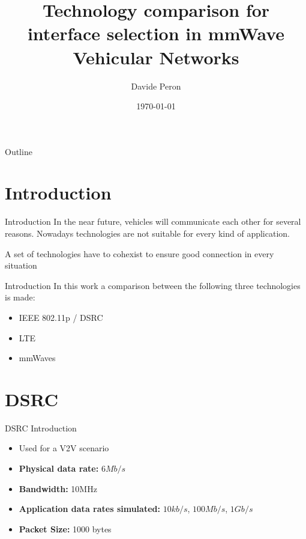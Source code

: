 \documentclass{beamer}
\title{Technology comparison for interface selection in mmWave Vehicular Networks}
\author{Davide Peron}
\date{\today}
\begin{document}
	\maketitle

	\begin{frame}{Outline}
		\tableofcontents
	\end{frame}


	\section{Introduction}

	\begin{frame}{Introduction}
		In the near future, vehicles will communicate each other for several reasons. Nowadays technologies are not suitable for every kind of application. \vspace{.5em}

		A set of technologies have to cohexist to ensure good connection in every situation \vspace{.5em}
	\end{frame}

	\begin{frame}{Introduction}
		In this work a comparison between the following three technologies is made: \vspace{.5em}
		\begin{itemize}
			\item IEEE 802.11p / DSRC\vspace{.5em}
			\item LTE \vspace{.5em}
			\item mmWaves
		\end{itemize}
	\end{frame}


	\section{DSRC}

	\begin{frame}{DSRC Introduction}
		\begin{itemize}
			\item Used for a V2V scenario
			\item \textbf{Physical data rate: } $6Mb/s$\vspace{.5em}
			\item \textbf{Bandwidth: } 10MHz\vspace{.5em}
			\item \textbf{Application data rates simulated: } $10kb/s$, $100Mb/s$, $1Gb/s$
			\item \textbf{Packet Size: } 1000 bytes
		\end{itemize}
	\end{frame}
\end{document}
